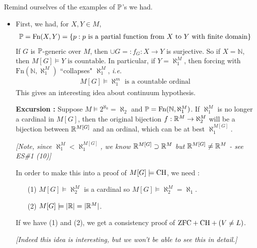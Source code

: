 \documentclass[12pt,a4paper]{article}
\begin{document}
\quad Remind ourselves of the examples of $\mathbb{P}$'s we had.
\begin{itemize}
\item First, we had, for $X, Y\in M$,
\begin{align*}
\mathbb{P} = \text{Fn}(X, Y) = \{p: p\text{ is a partial function from }X \text{ to }Y\text{ with finite domain}\}
\end{align*}
If $G$ is $\mathbb{P}$-generic over $M$, then $\cup G=: f_G : X\rightarrow Y$ is surjective. So if $X = \mathbb{N}$, then $M[G] \models Y\text{ is countable}$. In particular, if $Y = \aleph_1^M$, then forcing with $\text{Fn}(\mathbb{N}, \aleph_1^M)$ ``collapses" $\aleph_1^M$, \textit{i.e.}
\begin{align*}
M[G] \models \aleph_1^m \text{ is a countable ordinal}
\end{align*}
This gives an interesting idea about continuum hypothesis.

\textbf{Excursion :} Suppose $M \models 2^{\aleph_0} = \aleph_2$ and $\mathbb{P} = \text{Fn}(\mathbb{N}, \aleph_1^M)$. If $\aleph_1^M$ is no longer a cardinal in $M[G]$, then the original bijection $f: \mathbb{R}^M \rightarrow \aleph_2^M$ will be a bijection between $\mathbb{R}^{M[G]}$ and an ordinal, which can be at best $\aleph_1^{M[G]}$.

\emph{[Note, since $\aleph_1^M < \aleph_1^{M[G]}$, we know $\mathbb{R}^{M[G]} \supset \mathbb{R}^M$ but $\mathbb{R}^{M[G]} \neq \mathbb{R}^M$ - see ES\#1 (10)]}

\quad In order to make this into a proof of $M[G] \models \text{CH}$, we need :
\begin{itemize}
\item[(1)] $M[G] \models \aleph_2^M$ is a cardinal so $M[G] \models \aleph_2^M = \aleph_1$. 
\item[(2)] $M[G] \models |\mathbb{R}| = |\mathbb{R}^M|$.
\end{itemize}
If we have (1) and (2), we get a consistency proof of $\text{ZFC} + \text{CH} + (V\neq L)$.

\emph{[Indeed this idea is interesting, but we won't be able to see this in detail.]}


\end{itemize}
\end{document}
